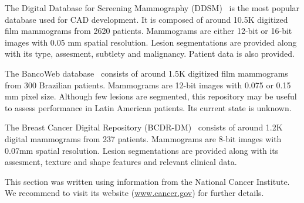 The Digital Database for Screening Mammography (DDSM)~\cite{Heath2001} is the most popular database used for CAD development. It is composed of around 10.5K digitized film mammograms from 2620 patients. Mammograms are either 12-bit or 16-bit images with 0.05 mm spatial resolution. Lesion segmentations are provided along with its type, assesment, subtlety and malignancy. Patient data is also provided.

The BancoWeb database~\cite{Nepomuceno2011} consists of around 1.5K digitized film mammograms from 300 Brazilian patients. Mammograms are 12-bit images with 0.075 or 0.15 mm pixel size. Although few lesions are segmented, this repository may be useful to assess performance in Latin American patients. Its current state is unknown.

The Breast Cancer Digital Repository (BCDR-DM)~\cite{Moura2013a, Moura2013b} consists of around 1.2K digital mammograms from 237 patients. Mammograms are 8-bit images with 0.07mm spatial resolution. Lesion segmentations are provided along with its assesment, texture  and shape features and relevant clinical data.

This section was written using information from the National Cancer Institute. We recommend to visit its website (\url{www.cancer.gov}) for further details.
